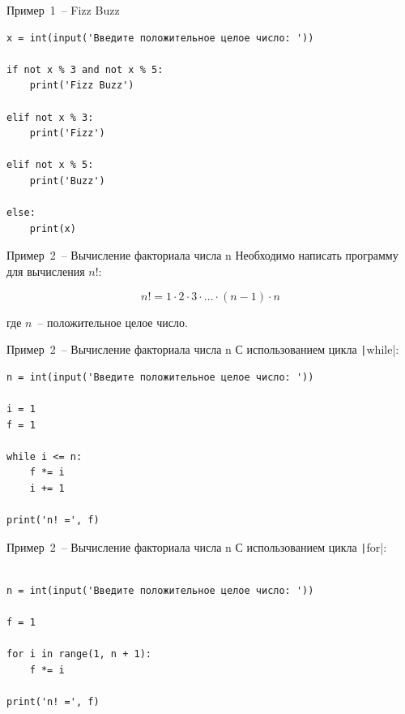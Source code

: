 \documentclass[aspectratio=169]{beamer}	%
\begin{document}
\begin{frame}[fragile]{Пример~1~-- Fizz Buzz}
\scriptsize
\begin{verbatim}
x = int(input('Введите положительное целое число: '))

if not x % 3 and not x % 5:
    print('Fizz Buzz')

elif not x % 3:
    print('Fizz')

elif not x % 5:
    print('Buzz')

else:
    print(x) 
\end{verbatim}
\vfill
\end{frame}


\begin{frame}[fragile]{Пример~2~-- Вычисление факториала числа n}
\scriptsize
Необходимо написать программу для вычисления $n!$:

$$
	n! = 1 \cdot 2 \cdot 3 \cdot \ldots \cdot (n-1) \cdot n
$$

где $n$~-- положительное целое число.
\vfill
\end{frame}


\begin{frame}[fragile]{Пример~2~-- Вычисление факториала числа n}
\scriptsize
С использованием цикла \texttt|while|:

\begin{verbatim}
n = int(input('Введите положительное целое число: '))

i = 1
f = 1

while i <= n:
    f *= i
    i += 1

print('n! =', f)
\end{verbatim}
\vfill
\end{frame}


\begin{frame}[fragile]{Пример~2~-- Вычисление факториала числа n}
\scriptsize
С использованием цикла \texttt|for|:
	
\begin{verbatim}

n = int(input('Введите положительное целое число: '))

f = 1

for i in range(1, n + 1):
    f *= i

print('n! =', f) 
\end{verbatim}
\vfill
\end{frame}


\end{document}

